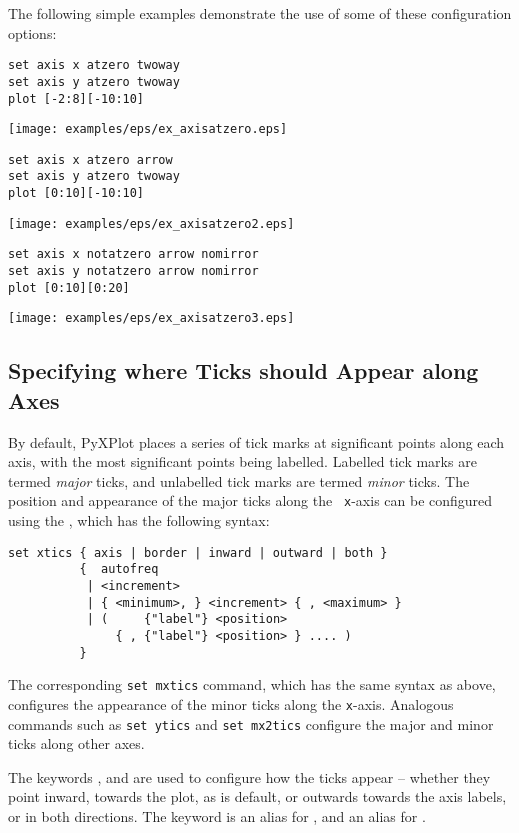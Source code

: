 The following simple examples demonstrate the use of some of these configuration options:
\begin{verbatim}
set axis x atzero twoway
set axis y atzero twoway
plot [-2:8][-10:10]
\end{verbatim}

\centerline{\texttt{[image: examples/eps/ex\_axisatzero.eps]}}

\begin{verbatim}
set axis x atzero arrow
set axis y atzero twoway
plot [0:10][-10:10]
\end{verbatim}

\centerline{\texttt{[image: examples/eps/ex\_axisatzero2.eps]}}

\begin{verbatim}
set axis x notatzero arrow nomirror
set axis y notatzero arrow nomirror
plot [0:10][0:20]
\end{verbatim}

\centerline{\texttt{[image: examples/eps/ex\_axisatzero3.eps]}}

\subsection{Specifying where Ticks should Appear along Axes}

By default, PyXPlot places a series of tick marks at significant points along
each axis, with the most significant points being labelled.  Labelled tick
marks are termed {\it major} ticks, and unlabelled tick marks are termed {\it
minor} ticks.  The position and appearance of the major ticks along the {\tt
x}-axis can be configured using the , which has the
following syntax:

\begin{verbatim}
set xtics { axis | border | inward | outward | both }
          {  autofreq
           | <increment>
           | { <minimum>, } <increment> { , <maximum> }
           | (     {"label"} <position>
               { , {"label"} <position> } .... )
          }
\end{verbatim}

The corresponding {\tt set mxtics} command, which has the same syntax as above,
configures the appearance of the minor ticks along the {\tt x}-axis. Analogous
commands such as {\tt set ytics} and {\tt set mx2tics} configure the major and
minor ticks along other axes.

The keywords ,  and  are used to
configure how the ticks appear -- whether they point inward, towards the plot,
as is default, or outwards towards the axis labels, or in both directions.  The
keyword  is an alias for , and 
an alias for .

